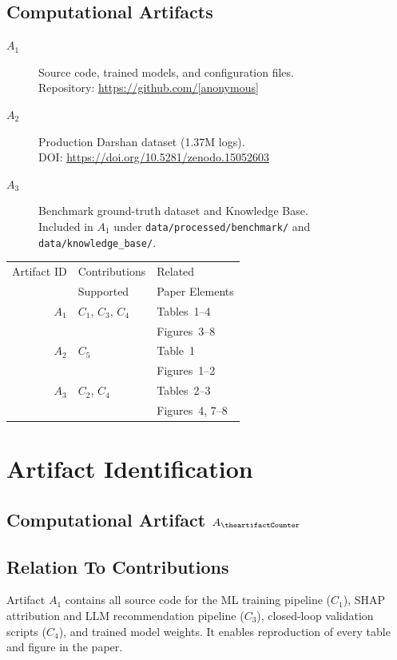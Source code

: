 \documentclass[conference]{IEEEtran}
\newcounter{artifactCounter}
\newcommand{\newartifact}{%
    \stepcounter{artifactCounter}%
    \subsection{Computational Artifact $A_{\theartifactCounter}$}%
}
\newcommand{\artrel}{\subsection*{Relation To Contributions}}
\begin{document}
\subsection{Computational Artifacts}

\begin{description}
\item[$A_1$] Source code, trained models, and configuration files.\\
Repository: \url{https://github.com/[anonymous]}
\item[$A_2$] Production Darshan dataset (1.37M logs).\\
DOI: \url{https://doi.org/10.5281/zenodo.15052603}
\item[$A_3$] Benchmark ground-truth dataset and Knowledge Base.\\
Included in $A_1$ under \texttt{data/processed/benchmark/} and
\texttt{data/knowledge\_base/}.
\end{description}

\vspace{1ex}
\begin{center}
\begin{tabular}{rll}
\toprule
Artifact ID & Contributions & Related \\
            & Supported     & Paper Elements \\
\midrule
$A_1$ & $C_1$, $C_3$, $C_4$ & Tables~1--4 \\
      &                      & Figures~3--8 \\
\midrule
$A_2$ & $C_5$ & Table~1 \\
      &       & Figures~1--2 \\
\midrule
$A_3$ & $C_2$, $C_4$ & Tables~2--3 \\
      &              & Figures~4, 7--8 \\
\bottomrule
\end{tabular}
\end{center}

\section{Artifact Identification}

\newartifact

\artrel
Artifact $A_1$ contains all source code for the ML training pipeline
($C_1$), SHAP attribution and LLM recommendation pipeline ($C_3$),
closed-loop validation scripts ($C_4$), and trained model weights.
It enables reproduction of every table and figure in the paper.
\end{document}
